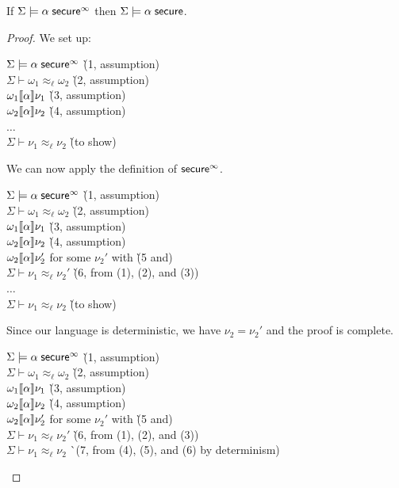 \documentclass[11pt]{article}
\begin{document}
\begin{theorem}
  If $\Sigma \models \alpha\; \mathsf{secure}^\infty$ then $\Sigma \models \alpha\; \mathsf{secure}$.
\end{theorem}
\begin{proof}
  We set up:
  \begin{tabbing}
    $\Sigma \models \alpha\; \mathsf{secure}^\infty$ \` (1, assumption) \\
    $\Sigma \vdash \omega_1 \approx_\ell \omega_2$ \` (2, assumption) \\
    $\omega_1 \llbracket \alpha \rrbracket \nu_1$ \` (3, assumption) \\
    $\omega_2 \llbracket \alpha \rrbracket \nu_2$ \` (4, assumption) \\
    $\ldots$ \\
    $\Sigma \vdash \nu_1 \approx_\ell \nu_2$ \` (to show)
  \end{tabbing}
  We can now apply the definition of $\mathsf{secure}^\infty$.
  \begin{tabbing}
    $\Sigma \models \alpha\; \mathsf{secure}^\infty$ \` (1, assumption) \\
    $\Sigma \vdash \omega_1 \approx_\ell \omega_2$ \` (2, assumption) \\
    $\omega_1 \llbracket \alpha \rrbracket \nu_1$ \` (3, assumption) \\
    $\omega_2 \llbracket \alpha \rrbracket \nu_2$ \` (4, assumption) \\
    \color{blue}$\omega_2 \llbracket \alpha \rrbracket \nu_2'$ for some $\nu_2'$ with \` (5 and) \\
    \color{blue}$\Sigma \vdash \nu_1 \approx_\ell \nu_2'$ \` (6, from (1), (2), and (3)) \\
    $\ldots$ \\
    $\Sigma \vdash \nu_1 \approx_\ell \nu_2$ \` (to show)
  \end{tabbing}
  Since our language is deterministic, we have $\nu_2 = \nu_2'$ and the
  proof is complete.
  \begin{tabbing}
    $\Sigma \models \alpha\; \mathsf{secure}^\infty$ \` (1, assumption) \\
    $\Sigma \vdash \omega_1 \approx_\ell \omega_2$ \` (2, assumption) \\
    $\omega_1 \llbracket \alpha \rrbracket \nu_1$ \` (3, assumption) \\
    $\omega_2 \llbracket \alpha \rrbracket \nu_2$ \` (4, assumption) \\
    \color{blue}$\omega_2 \llbracket \alpha \rrbracket \nu_2'$ for some $\nu_2'$ with \` (5 and) \\
    \color{blue}$\Sigma \vdash \nu_1 \approx_\ell \nu_2'$ \` (6, from (1), (2), and (3)) \\
    $\Sigma \vdash \nu_1 \approx_\ell \nu_2$ \` \color{blue}(7, from (4), (5), and (6) by determinism)
  \end{tabbing}
\end{proof}
\end{document}
